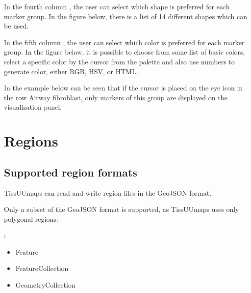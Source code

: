 \documentclass[letterpaper,10pt,english,openany,oneside]{sphinxmanual}
\begin{document}
\sphinxAtStartPar
In the fourth column , the user can select which shape is preferred for each marker group. In the figure below, there is a list of 14 different shapes which can be used.

\sphinxAtStartPar
{}

\sphinxAtStartPar
In the fifth column , the user can select which color is preferred for each marker group. In the figure below, it is possible to choose from some list of basic colors, select a specific color by the cursor from the palette and also use numbers to generate color, either RGB, HSV, or HTML.

\sphinxAtStartPar
{}

\sphinxAtStartPar
In the example below can be seen that if the cursor is placed on the eye icon in the row Airway fibroblast, only markers of this group are displayed on the visualization panel.

\sphinxAtStartPar
{}

\sphinxstepscope


\section{Regions}
\label{\detokenize{docs/starting/regions:regions}}\label{\detokenize{docs/starting/regions::doc}}

\subsection{Supported region formats}
\label{\detokenize{docs/starting/regions:supported-region-formats}}
\sphinxAtStartPar
TissUUmaps can read and write region files in the GeoJSON format.

\sphinxAtStartPar
Only a subset of the GeoJSON format is supported, as TissUUmaps uses only polygonal regions:

\sphinxAtStartPar
{}:
\begin{itemize}
\item {} 
\sphinxAtStartPar
Feature

\item {} 
\sphinxAtStartPar
FeatureCollection

\item {} 
\sphinxAtStartPar
GeometryCollection

\end{itemize}
\end{document}
